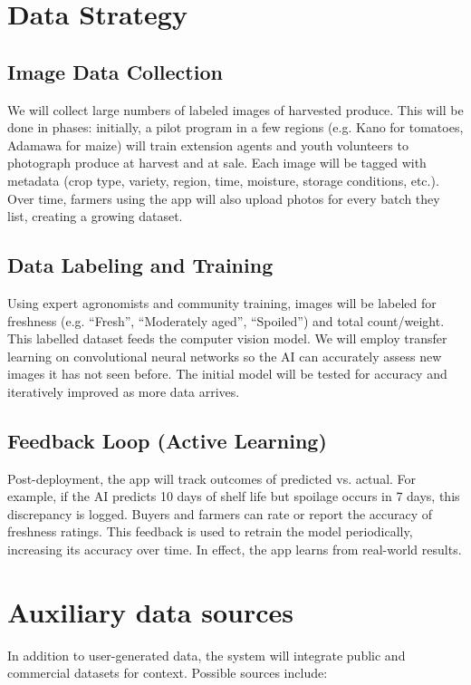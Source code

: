 {\section{Data Strategy}

\subsection{Image Data Collection}
We will collect large numbers of labeled images of harvested produce. This will be done in phases: initially, a pilot program in a few regions (e.g. Kano for tomatoes, Adamawa for maize) will train extension agents and youth volunteers to photograph produce at harvest and at sale. Each image will be tagged with metadata (crop type, variety, region, time, moisture, storage conditions, etc.). Over time, farmers using the app will also upload photos for every batch they list, creating a growing dataset.

\subsection{Data Labeling and Training}
Using expert agronomists and community training, images will be labeled for freshness (e.g. “Fresh”, “Moderately aged”, “Spoiled”) and total count/weight. This labelled dataset feeds the computer vision model. We will employ transfer learning on convolutional neural networks so the AI can accurately assess new images it has not seen before. The initial model will be tested for accuracy and iteratively improved as more data arrives.

\subsection{Feedback Loop (Active Learning)}
Post-deployment, the app will track outcomes of predicted vs. actual. For example, if the AI predicts 10 days of shelf life but spoilage occurs in 7 days, this discrepancy is logged. Buyers and farmers can rate or report the accuracy of freshness ratings. This feedback is used to retrain the model periodically, increasing its accuracy over time. In effect, the app learns from real-world results.

\section{Auxiliary data sources}
In addition to user-generated data, the system will integrate public and commercial datasets for context. Possible sources include:


}
